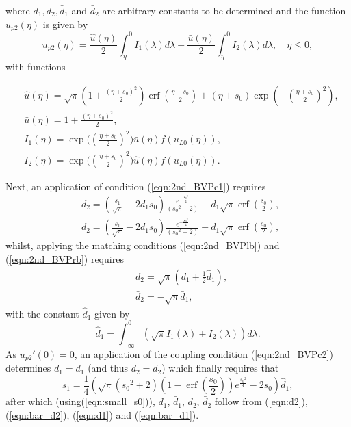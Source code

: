 \documentclass[11pt,a4paper]{article}
\newcommand{\eeref}[1]{(\ref{eqn:#1})}
\newcommand{\eelab}[1]{\label{eqn:#1}}
\def\beq{\begin{equation}}
\def\eeq{\end{equation}}
\DeclareMathOperator\erf{erf}
\begin{document}
where $d_1, d_2, \bar{d}_1$ and $\bar{d}_2$ are arbitrary constants to be determined and the function $u_{p2}(\eta)$ is given by
\beq
u_{p2}(\eta) =  \frac{\hat{u}(\eta)}{2}  \int_{\eta}^0 I_1(\lambda) d \lambda - \frac{\bar{u}(\eta)}{2}  \int_{\eta}^0 I_2(\lambda) d \lambda   , \quad \eta \leq 0 ,  \eelab{par_sol}
\eeq
with functions
\begin{linenomath}
\begin{subequations} \eelab{small_t_functions}
\begin{align}
& \hat{u}(\eta)= \sqrt{\pi} \left( 1 + \frac{(\eta + s_0)^2}{2} \right)  \erf \left( \frac{\eta + s_0}{2} \right) +  (\eta + s_0)  \exp \left( - \left( \frac{\eta + s_0}{2} \right)^2 \right),  \\ 
& \bar{u}(\eta) =  1 + \frac{(\eta + s_0)^2}{2}, \\	
& I_1(\eta)= \exp \bigg( \left( \frac{\eta + s_0}{2} \right)^2 \bigg)  \bar{u}(\eta)  f(u_{L0}(\eta)), \\
& I_2(\eta) = \exp \bigg( \left( \frac{\eta + s_0}{2} \right)^2 \bigg)  \hat{u}(\eta)  f(u_{L0}(\eta)).
\end{align}
\end{subequations}
\end{linenomath}
%
Next, an application of condition \eeref{2nd_BVPc1} requires 
 \begin{align}
& d_2 =  \left( \frac{s_1}{\sqrt{\pi}} -2 d_1 s_0 \right)  \frac{e^{- \frac{{s_0}^2}{4}} }{\left( {s_0}^2+2 \right) }  - d_1 \sqrt{\pi} \erf \left( \frac{s_0}{2} \right) , \eelab{d2}  \\
& \bar{d}_2 =  \left( \frac{s_1}{\sqrt{\pi}} -2 \bar{d}_1 s_0 \right)  \frac{e^{- \frac{{s_0}^2}{4}} }{\left( {s_0}^2+2 \right) }  - \bar{d}_1 \sqrt{\pi} \erf \left( \frac{s_0}{2} \right), \eelab{bar_d2} \
\end{align}
whilst, applying the matching conditions \eeref{2nd_BVPlb} and \eeref{2nd_BVPrb} requires 
\begin{align}
& d_2 = \sqrt{\pi}\left(d_1+\frac{1}{2} \hat{d}_1\right),  \eelab{d1}  \\
& \bar{d}_2 = -  \sqrt{\pi} \bar{d}_1 , \eelab{bar_d1}
%
\end{align}
with the constant $\hat{d}_1$ given by
\beq \eelab{s1_con}
\hat{d}_1 = \int_{- \infty}^0  \left(\sqrt{\pi} I_1(\lambda)  + I_2(\lambda)\right) d \lambda.
 \eeq
As $u_{p2}'(0)=0$, an application of the coupling condition \eeref{2nd_BVPc2} determines $d_1=\bar{d}_1$ (and thus $d_2=\bar{d}_2$) which finally requires that
\beq 
s_1 = \frac{1}{4}  \left( \sqrt{\pi} ({s_0}^2 +2) \left( 1 - \erf \left( \frac{s_0}{2} \right) \right) e^{\frac{{s_0}^2}{4}}  - 2 s_0  \right)   \hat{d}_1, \eelab{exp_small_s1}
\eeq
 after which  (using\eeref{small_s0}), $d_1$, $\bar{d}_1$, $d_2$, $\bar{d}_2$ follow from   \eeref{d2}, \eeref{bar_d2}, \eeref{d1}   and \eeref{bar_d1}. 
\end{document}

